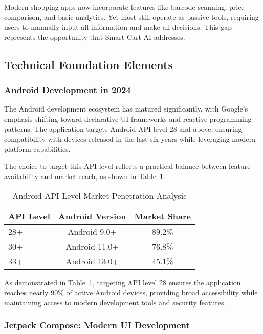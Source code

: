 \documentclass[11pt,a4paper]{article}
\begin{document}
Modern shopping apps now incorporate features like barcode scanning, price comparison, and basic analytics. Yet most still operate as passive tools, requiring users to manually input all information and make all decisions. This gap represents the opportunity that Smart Cart AI addresses.

\subsection{Technical Foundation Elements}

\subsubsection{Android Development in 2024}

The Android development ecosystem has matured significantly, with Google's emphasis shifting toward declarative UI frameworks and reactive programming patterns. The application targets Android API level 28 and above, ensuring compatibility with devices released in the last six years while leveraging modern platform capabilities.

The choice to target this API level reflects a practical balance between feature availability and market reach, as shown in Table~\ref{tab:android_compatibility}.

\begin{table}[H]
\centering
\caption{Android API Level Market Penetration Analysis}
\label{tab:android_compatibility}
\begin{tabular}{@{}lcc@{}}
\toprule
\textbf{API Level} & \textbf{Android Version} & \textbf{Market Share} \\
\midrule
28+ & Android 9.0+ & 89.2\% \\
30+ & Android 11.0+ & 76.8\% \\
33+ & Android 13.0+ & 45.1\% \\
\bottomrule
\end{tabular}
\end{table}

As demonstrated in Table~\ref{tab:android_compatibility}, targeting API level 28 ensures the application reaches nearly 90\% of active Android devices, providing broad accessibility while maintaining access to modern development tools and security features.

\subsubsection{Jetpack Compose: Modern UI Development}
\end{document}

